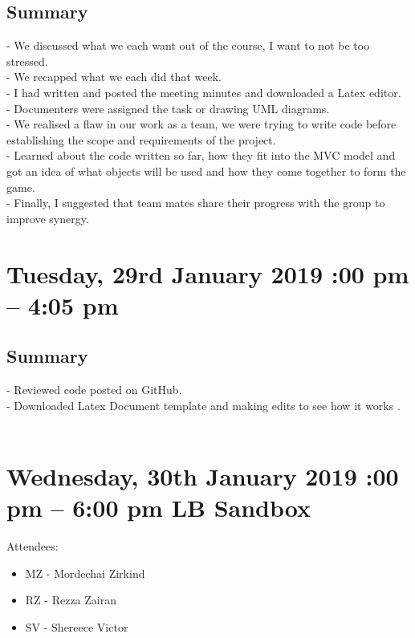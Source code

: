 \documentclass[12pt]{article}
\begin{document}
\subsection{Summary}
-	We discussed what we each want out of the course, I want to not be too stressed. \\
-	We recapped what we each did that week. \\
-	I had written and posted the meeting minutes and downloaded a Latex editor. \\
-	Documenters were assigned the task or drawing UML diagrams.\\
-	We realised a flaw in our work as a team, we were trying to write code before establishing the scope and requirements of the project. \\
-	Learned about the code written so far, how they fit into the MVC model and got an idea of what objects will be used and how they come together to form the game.\\
-	Finally, I suggested that team mates share their progress with the group to improve synergy. \\


\section{Tuesday, 29rd January 2019 :00 pm – 4:05 pm }

\subsection{Summary}
-	Reviewed code posted on GitHub.\\
-	Downloaded Latex Document template and making edits to see how it works .\\ \\

\section{Wednesday, 30th January 2019 :00 pm – 6:00 pm \textbar LB Sandbox}

Attendees: 
\begin{itemize}
	\item MZ - Mordechai Zirkind  
	\item RZ - Rezza Zairan 
	\item SV - Shereece Victor 
	
\end{itemize}
\end{document}

